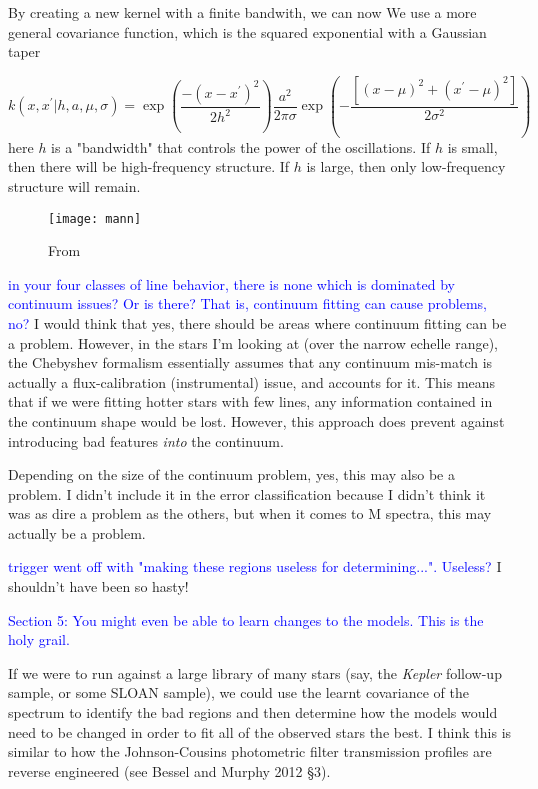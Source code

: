 \documentclass[preprint]{aastex} %
\newcommand{\hcom}[1]{ \textcolor{Blue}{#1}}
\begin{document}
By creating a new kernel with a finite bandwith, we can now 
We use a more general covariance function, which is the squared exponential with a Gaussian taper

\begin{equation}
k(x, x^\prime | h, a, \mu, \sigma) = \exp \left ( \frac{-( x - x^\prime)^2 }{2 h^2} \right ) \frac{a^2}{2 \pi \sigma} \exp \left ( - \frac{[(x - \mu)^2 + (x^\prime - \mu)^2]}{2 \sigma^2}\right )
\end{equation}
here $h$ is a "bandwidth" that controls the power of the oscillations. If $h$ is small, then there will be high-frequency structure. If $h$ is large, then only low-frequency structure will remain.

\begin{figure}[!htb]
\begin{center}
\texttt{[image: mann]}
\caption{From \citet{mga13}}
\label{fig:mann}
\end{center}
\end{figure}


\hcom{in your four classes of line behavior, there is none which is dominated by continuum issues? Or is there? That is, continuum fitting can cause problems, no?}
I would think that yes, there should be areas where continuum fitting can be a problem. However, in the stars I'm looking at (over the narrow echelle range), the Chebyshev formalism essentially assumes that any continuum mis-match is actually a flux-calibration (instrumental) issue, and accounts for it. This means that if we were fitting hotter stars with few lines, any information contained in the continuum shape would be lost. However, this approach does prevent against introducing bad features \emph{into} the continuum.

Depending on the size of the continuum problem, yes, this may also be a problem. I didn't include it in the error classification because I didn't think it was as dire a problem as the others, but when it comes to M spectra, this may actually be a problem.

\hcom{trigger went off with "making these regions useless for determining...". Useless?}
I shouldn't have been so hasty!

\hcom{Section 5: You might even be able to learn changes to the models. This is the holy grail.}

If we were to run against a large library of many stars (say, the \emph{Kepler} follow-up sample, or some SLOAN sample), we could use the learnt covariance of the spectrum to identify the bad regions and then determine how the models would need to be changed in order to fit all of the observed stars the best. I think this is similar to how the Johnson-Cousins photometric filter transmission profiles are reverse engineered (see Bessel and Murphy 2012 \S 3).
\end{document}
